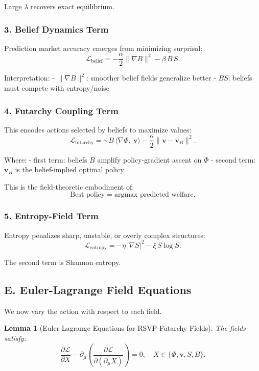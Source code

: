 \documentclass[12pt]{article}
\newtheorem{lemma}{Lemma}
\begin{document}
Large $\lambda$ recovers exact equilibrium.

\subsubsection*{3. Belief Dynamics Term}

Prediction market accuracy emerges from minimizing surprisal:
\[
\mathcal{L}_{\text{belief}}
=
- \frac{\alpha}{2}
    \|\nabla B\|^2
    - \beta\, B\, S.
\]

Interpretation:
- $\|\nabla B\|^2$: smoother belief fields generalize better  
- $B S$: beliefs must compete with entropy/noise

\subsubsection*{4. Futarchy Coupling Term}

This encodes actions selected by beliefs to maximize values:
\[
\mathcal{L}_{\text{futarchy}}
=
\gamma\, B\,
    \langle \nabla \Phi,\ \mathbf{v} \rangle
    - \frac{\kappa}{2}\| \mathbf{v} - \mathbf{v}_B \|^2.
\]

Where:
- first term: beliefs $B$ amplify policy-gradient ascent on $\Phi$
- second term: $\mathbf{v}_B$ is the belief-implied optimal policy

This is the field-theoretic embodiment of:
\[
\text{Best policy} = \text{argmax predicted welfare}.
\]

\subsubsection*{5. Entropy-Field Term}

Entropy penalizes sharp, unstable, or overly complex structures:
\[
\mathcal{L}_{\text{entropy}}
=
- \eta\, |\nabla S|^2 
- \xi\, S \log S.
\]

The second term is Shannon entropy.

\subsection*{E. Euler-Lagrange Field Equations}

We now vary the action with respect to each field.

\begin{lemma}[Euler-Lagrange Equations for RSVP-Futarchy Fields]
The fields satisfy:
\[
\frac{\partial \mathcal{L}}{\partial X}
-
\partial_\mu
\left(
\frac{\partial \mathcal{L}}{\partial(\partial_\mu X)}
\right)
= 0,
\quad
X \in \{\Phi, \mathbf{v}, S, B\}.
\]
\end{lemma}
\end{document}

